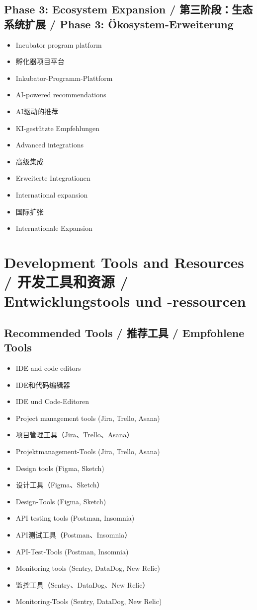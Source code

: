 \subsection{Phase 3: Ecosystem Expansion / 第三阶段：生态系统扩展 / Phase 3: Ökosystem-Erweiterung}
\begin{itemize}
    \item Incubator program platform
    \item 孵化器项目平台
    \item Inkubator-Programm-Plattform
    \item AI-powered recommendations
    \item AI驱动的推荐
    \item KI-gestützte Empfehlungen
    \item Advanced integrations
    \item 高级集成
    \item Erweiterte Integrationen
    \item International expansion
    \item 国际扩张
    \item Internationale Expansion
\end{itemize}

\section{Development Tools and Resources / 开发工具和资源 / Entwicklungstools und -ressourcen}

\subsection{Recommended Tools / 推荐工具 / Empfohlene Tools}
\begin{itemize}
    \item IDE and code editors
    \item IDE和代码编辑器
    \item IDE und Code-Editoren
    \item Project management tools (Jira, Trello, Asana)
    \item 项目管理工具（Jira、Trello、Asana）
    \item Projektmanagement-Tools (Jira, Trello, Asana)
    \item Design tools (Figma, Sketch)
    \item 设计工具（Figma、Sketch）
    \item Design-Tools (Figma, Sketch)
    \item API testing tools (Postman, Insomnia)
    \item API测试工具（Postman、Insomnia）
    \item API-Test-Tools (Postman, Insomnia)
    \item Monitoring tools (Sentry, DataDog, New Relic)
    \item 监控工具（Sentry、DataDog、New Relic）
    \item Monitoring-Tools (Sentry, DataDog, New Relic)
\end{itemize}

